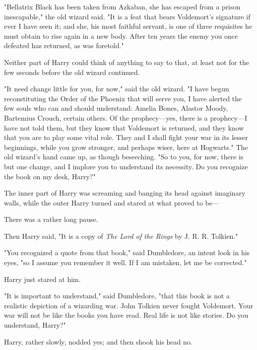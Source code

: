 "Bellatrix Black has been taken from Azkaban, she has escaped from a prison 
inescapable," the old wizard said. "It is a feat that bears Voldemort's 
signature if ever I have seen it; and she, his most faithful servant, is one of 
three requisites he must obtain to rise again in a new body. After ten years 
the enemy you once defeated has returned, as was foretold."

Neither part of Harry could think of anything to say to that, at least not for 
the few seconds before the old wizard continued.

"It need change little for you, for now," said the old wizard. "I have begun 
reconstituting the Order of the Phoenix that will serve you, I have alerted the 
few souls who can and should understand: Amelia Bones, Alastor Moody, Bartemius 
Crouch, certain others. Of the prophecy---yes, there is a prophecy---I have not 
told them, but they know that Voldemort is returned, and they know that you are 
to play some vital role. They and I shall fight your war in its lesser 
beginnings, while you grow stronger, and perhaps wiser, here at Hogwarts." The 
old wizard's hand came up, as though beseeching. "So to you, for now, there is 
but one change, and I implore you to understand its necessity. Do you recognize 
the book on my desk, Harry?"

The inner part of Harry was screaming and banging its head against imaginary 
walls, while the outer Harry turned and stared at what proved to be---

There was a rather long pause.

Then Harry said, "It is a copy of \emph{The Lord of the Rings} by J. R. R. 
Tolkien."

"You recognized a quote from that book," said Dumbledore, an intent look in his 
eyes, "so I assume you remember it well. If I am mistaken, let me be corrected."

Harry just stared at him.

"It is important to understand," said Dumbledore, "that this book is not a 
realistic depiction of a wizarding war. John Tolkien never fought Voldemort. 
Your war will not be like the books you have read. Real life is not like 
stories. Do you understand, Harry?"

Harry, rather slowly, nodded yes; and then shook his head no.

